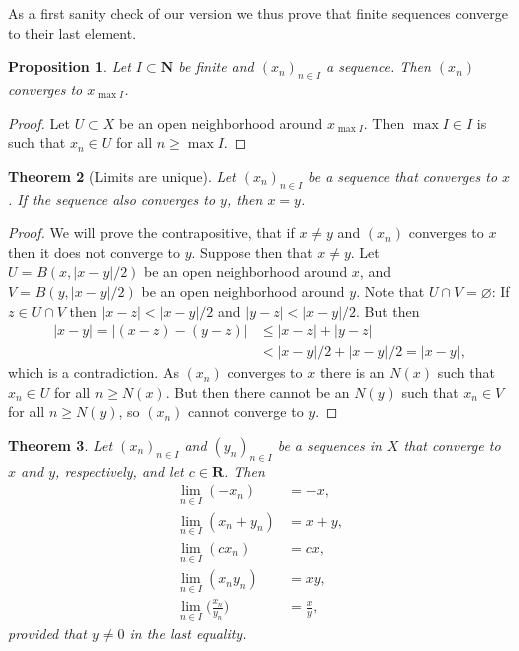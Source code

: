 \documentclass[11pt]{article}
\newtheorem{theo}{Theorem}
\newtheorem{prop}[theo]{Proposition}
\theoremstyle{definition}
\def\empty{\varnothing}
\def\NN{\mathbf{N}}
\def\RR{\mathbf{R}}
\begin{document}
As a first sanity check of our version we thus prove that finite sequences
converge to their last element.


\begin{prop}
Let $I \subset \NN$ be finite and $(x_n)_{n \in I}$ a sequence.
Then $(x_n)$ converges to $x_{\max I}$.
\end{prop}

\begin{proof}
Let $U \subset X$ be an open neighborhood around $x_{\max I}$.
Then $\max I \in I$ is such that $x_n \in U$ for all $n \geq \max I$.
\end{proof}


\begin{theo}[Limits are unique]
Let $(x_n)_{n \in I}$ be a sequence that converges to $x$.
If the sequence also converges to $y$, then $x = y$.
\end{theo}

\begin{proof}
We will prove the contrapositive, that if $x \not= y$ and $(x_n)$ converges
to $x$ then it does not converge to $y$.
Suppose then that $x \not= y$.
Let $U = B(x, |x-y|/2)$ be an open neighborhood around $x$, and
$V = B(y, |x-y|/2)$ be an open neighborhood around $y$.
Note that $U \cap V = \empty$:
If $z \in U \cap V$ then $|x - z| < |x - y|/2$ and $|y - z| < |x - y|/2$.
But then
\begin{align*}
|x - y|
= |(x - z) - (y - z)|
&\leq |x - z| + |y - z|
\\
&< |x - y|/2 + |x - y|/2
= |x - y|,
\end{align*}
which is a contradiction.
As $(x_n)$ converges to $x$ there is an $N(x)$ such that $x_n \in U$
for all $n \geq N(x)$.
But then there cannot be an $N(y)$ such that $x_n \in V$ for all $n \geq N(y)$,
so $(x_n)$ cannot converge to $y$.
\end{proof}



\begin{theo}
Let $(x_n)_{n \in I}$ and $(y_n)_{n \in I}$ be a sequences in $X$
that converge to $x$ and $y$, respectively, and let $c \in \RR$.
Then
\begin{align*}
\lim_{n \in I}(-x_n) &= -x,
\\
\lim_{n \in I}(x_n + y_n) &= x + y,
\\
\lim_{n \in I}(c x_n) &= c x,
\\
\lim_{n \in I} (x_n y_n) &= x y,
\\
\lim_{n \in I} \biggl( \frac{x_n}{y_n} \biggr) &= \frac{x}{y},
\end{align*}
provided that $y \not= 0$ in the last equality.
\end{theo}
\end{document}
